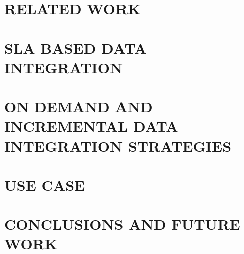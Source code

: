 \documentclass[a4paper,twoside]{article}
\begin{document}
\section{\uppercase{Related Work}}
\label{sec:relWork}


\section{\uppercase{SLA based data integration}}
\label{sec:slaDataInteg}


\section{\uppercase{On demand and incremental data integration strategies}}
\label{sec:incremental}


\section{\uppercase{Use case}}
\label{sec:useCase}



\section{\uppercase{Conclusions and Future work}}
\label{sec:conclusions}



\vfill

{\small
}




\vfill
\end{document}
